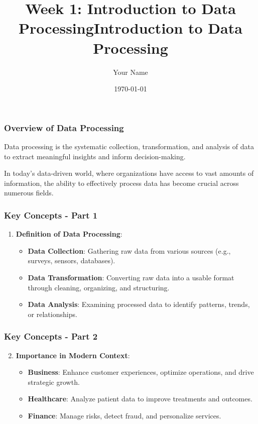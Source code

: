 \documentclass{beamer}
\title{Week 1: Introduction to Data Processing}
\author{Your Name}
\institute{Your Institution}
\date{\today}
\begin{document}
\frame{\titlepage}

\begin{frame}[fragile]
    \title{Introduction to Data Processing}
\end{frame}

\begin{frame}[fragile]
    \frametitle{Overview of Data Processing}
    Data processing is the systematic collection, transformation, and analysis of data to extract meaningful insights and inform decision-making.

    In today's data-driven world, where organizations have access to vast amounts of information, the ability to effectively process data has become crucial across numerous fields.
\end{frame}

\begin{frame}[fragile]
    \frametitle{Key Concepts - Part 1}
    \begin{enumerate}
        \item \textbf{Definition of Data Processing}:
        \begin{itemize}
            \item \textbf{Data Collection}: Gathering raw data from various sources (e.g., surveys, sensors, databases).
            \item \textbf{Data Transformation}: Converting raw data into a usable format through cleaning, organizing, and structuring.
            \item \textbf{Data Analysis}: Examining processed data to identify patterns, trends, or relationships.
        \end{itemize}
    \end{enumerate}
\end{frame}

\begin{frame}[fragile]
    \frametitle{Key Concepts - Part 2}
    \begin{enumerate}
        \setcounter{enumi}{1}
        \item \textbf{Importance in Modern Context}:
        \begin{itemize}
            \item \textbf{Business}: Enhance customer experiences, optimize operations, and drive strategic growth.
            \item \textbf{Healthcare}: Analyze patient data to improve treatments and outcomes.
            \item \textbf{Finance}: Manage risks, detect fraud, and personalize services.
        \end{itemize}
    \end{enumerate}
\end{frame}
\end{document}
